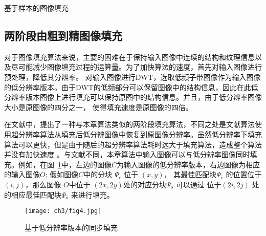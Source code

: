 \begin{algorithm}[!htbp]
\LinesNumbered
{}



\caption{基于样本的图像填充}
\label{ch3:alg:inpainting}
\end{algorithm}

\subsection{两阶段由粗到精图像填充}
\label{sec:2.2}
对于图像填充算法来说，主要的困难在于保持输入图像中连续的结构和纹理信息以及尽可能减少图像填充过程的运算量。为了加快算法的速度，首先对输入图像进行预处理，降低其分辨率。 对输入图像进行DWT，选取低频子带图像作为输入图像的低分辨率版本。由于DWT的低频部分可以保留图像中的结构信息，因此在此低分辨率版本图像上进行填充可以保持原图中的结构信息。并且，由于低分辨率图像大小是原图像的四分之一， 使得填充速度是原图像的四倍。\par
在文献中，提出了一种与本章算法类似的两阶段填充算法，不同之处是文献算法使用超分辨率算法从填充后低分辨图像中恢复到原图像分辨率。虽然低分辨率下填充算法可以更快，但是由于随后的超分辨率算法耗时远大于填充算法，造成整个算法并没有加快速度 。与文献不同，本章算法中输入图像可以与低分辨率图像同时填充。例如，在图~\ref{ch3:fig:4}中，左边的图像\(C\)为输入图像的低分辨率版本，右边图像为相应的输入图像\(O\); 假如图像\(C\)中的分块 \(\Psi_c\) 位于 \((x,y)\)， 其最佳匹配块\(\Psi_{\hat{c}}\) 的位置位于 \((i, j)\)，那么图像 \(O\)中位于 \((2x, 2y)\)处的对应分块\(\Psi_o\) 可以通过 位于\((2i, 2j)\) 处的相应最佳匹配块\(\Psi_{\hat{o}}\) 来进行填充。\par
\begin{figure}[!htbp]
	\begin{center}
			\texttt{[image: ch3/fig4.jpg]}
	\end{center}
    \caption{基于低分辨率版本的同步填充}
	\label{ch3:fig:4}
\end{figure}

